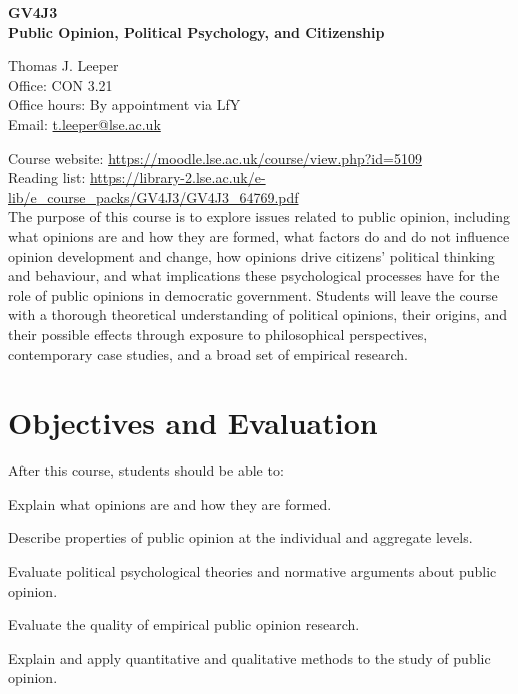 \documentclass[12pt,a4paper]{article}
\begin{document}
\nobibliography*
\faketableofcontents

\begin{center}
{\Large
\noindent \textbf{GV4J3\\ Public Opinion, Political Psychology, and Citizenship}
}
\end{center}
\vspace{1em}

\noindent
Thomas J. Leeper\\
Office: CON 3.21\\
Office hours: By appointment via LfY\\
Email: \href{mailto:t.leeper@lse.ac.uk}{t.leeper@lse.ac.uk}

\vspace{1em}

\noindent Course website: \url{https://moodle.lse.ac.uk/course/view.php?id=5109}\\
Reading list: \url{https://library-2.lse.ac.uk/e-lib/e_course_packs/GV4J3/GV4J3_64769.pdf}\\

\noindent The purpose of this course is to explore issues related to public opinion, including what opinions are and how they are formed, what factors do and do not influence opinion development and change, how opinions drive citizens' political thinking and behaviour, and what implications these psychological processes have for the role of public opinions in democratic government. Students will leave the course with a thorough theoretical understanding of political opinions, their origins, and their possible effects through exposure to philosophical perspectives, contemporary case studies, and a broad set of empirical research.

\section{Objectives and Evaluation}
After this course, students should be able to:
\begin{enumerate*}
\item Explain what opinions are and how they are formed.
\item Describe properties of public opinion at the individual and aggregate levels.
\item Evaluate political psychological theories and normative arguments about public opinion.
\item Evaluate the quality of empirical public opinion research.
\item Explain and apply quantitative and qualitative methods to the study of public opinion.
\end{enumerate*}
\end{document}
